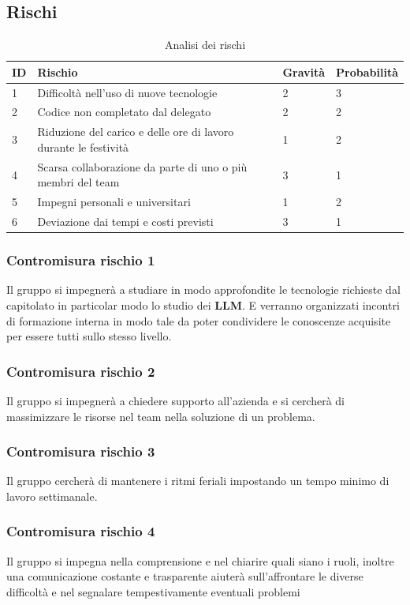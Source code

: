 \documentclass{article}
\begin{document}
\subsection{Rischi}
\begin{table}[h]
    \centering
    \begin{tabular}{|p{0.5cm}|p{7cm}|p{2cm}|p{2cm}|}
        \hline
        \textbf{ID} & \textbf{Rischio} & \textbf{Gravità} & \textbf{Probabilità} \\
        \hline
        1 & Difficoltà nell'uso di nuove tecnologie & 2 & 3 \\ 
        \hline
        2 & Codice non completato dal delegato & 2 & 2 \\ 
        \hline
        3 & Riduzione del carico e delle ore di lavoro durante le festività & 1 & 2 \\ 
        \hline 
        4 & Scarsa collaborazione da parte di uno o più membri del team & 3 & 1 \\ 
        \hline
        5 & Impegni personali e universitari & 1 & 2 \\ 
        \hline 
        6 & Deviazione dai tempi e costi previsti & 3 & 1 \\
        \hline
    \end{tabular}
    \caption{Analisi dei rischi}
    \label{tab:analisi_rischi}
\end{table}

\subsubsection{Contromisura rischio 1}
Il gruppo si impegnerà a studiare in modo approfondite le tecnologie richieste dal capitolato in particolar modo lo studio dei \textbf{LLM}. E verranno organizzati incontri di formazione interna in modo tale da poter condividere le conoscenze acquisite per essere tutti sullo stesso livello.
\subsubsection{Contromisura rischio 2}
Il gruppo si impegnerà a chiedere supporto all'azienda e si cercherà di massimizzare le risorse nel team nella soluzione di un problema.
\subsubsection{Contromisura rischio 3}
Il gruppo cercherà di mantenere i ritmi feriali impostando un tempo minimo di lavoro settimanale.
\subsubsection{Contromisura rischio 4}
Il gruppo si impegna nella comprensione e nel chiarire quali siano i ruoli, inoltre una comunicazione costante e trasparente aiuterà sull'affrontare le diverse difficoltà e nel segnalare tempestivamente eventuali problemi
\end{document}

